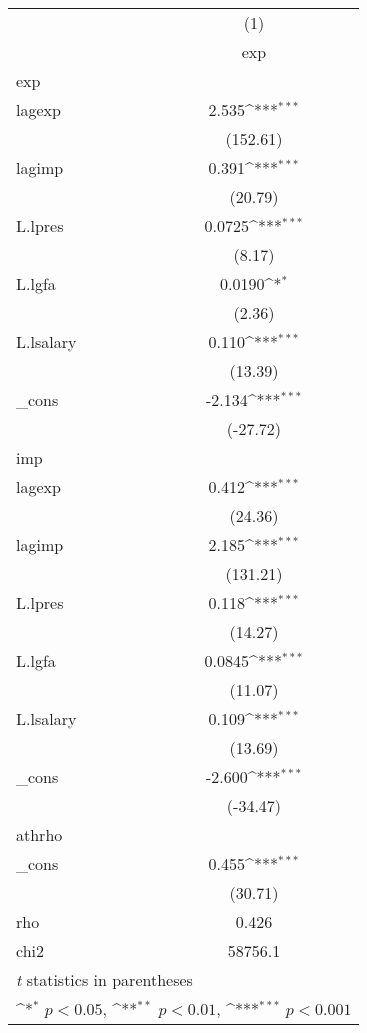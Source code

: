 {
\def\sym#1{\ifmmode^{#1}\else\(^{#1}\)\fi}
\begin{tabular}{l*{1}{c}}
\hline\hline
            &\multicolumn{1}{c}{(1)}\\
            &\multicolumn{1}{c}{exp}\\
\hline
exp         &                     \\
lagexp      &       2.535\sym{***}\\
            &    (152.61)         \\
[1em]
lagimp      &       0.391\sym{***}\\
            &     (20.79)         \\
[1em]
L.lpres     &      0.0725\sym{***}\\
            &      (8.17)         \\
[1em]
L.lgfa      &      0.0190\sym{*}  \\
            &      (2.36)         \\
[1em]
L.lsalary   &       0.110\sym{***}\\
            &     (13.39)         \\
[1em]
\_cons      &      -2.134\sym{***}\\
            &    (-27.72)         \\
\hline
imp         &                     \\
lagexp      &       0.412\sym{***}\\
            &     (24.36)         \\
[1em]
lagimp      &       2.185\sym{***}\\
            &    (131.21)         \\
[1em]
L.lpres     &       0.118\sym{***}\\
            &     (14.27)         \\
[1em]
L.lgfa      &      0.0845\sym{***}\\
            &     (11.07)         \\
[1em]
L.lsalary   &       0.109\sym{***}\\
            &     (13.69)         \\
[1em]
\_cons      &      -2.600\sym{***}\\
            &    (-34.47)         \\
\hline
athrho      &                     \\
\_cons      &       0.455\sym{***}\\
            &     (30.71)         \\
\hline
rho         &       0.426         \\
chi2        &     58756.1         \\
\hline\hline
\multicolumn{2}{l}{\footnotesize \textit{t} statistics in parentheses}\\
\multicolumn{2}{l}{\footnotesize \sym{*} \(p<0.05\), \sym{**} \(p<0.01\), \sym{***} \(p<0.001\)}\\
\end{tabular}
}
